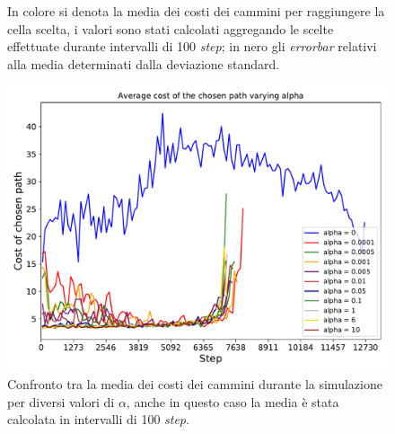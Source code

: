 \begin{figure}
\begin{tabular}{cc}
	\end{tabular}
	\caption{In colore si denota la media dei costi dei cammini per raggiungere la cella scelta, i valori sono stati calcolati aggregando le scelte effettuate durante intervalli di 100 \textit{step}; in nero gli \textit{errorbar} relativi alla media determinati dalla deviazione standard.}
	\label{fig:alphaOverTime}
\end{figure}

\begin{figure}
	\centering
	\includegraphics[width=0.9\linewidth]{images/alpha_results/comparison}
	\caption{Confronto tra la media dei costi dei cammini durante la simulazione per diversi valori di $\alpha$, anche in questo caso la media è stata calcolata in intervalli di 100 \textit{step}.}
	\label{fig:alphaComparison}
\end{figure}
